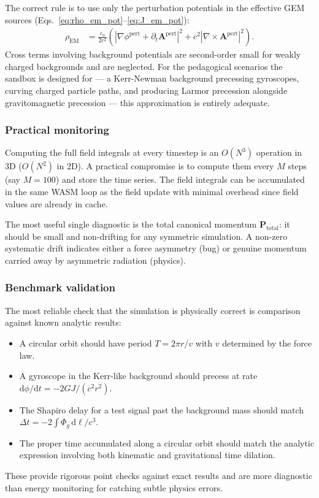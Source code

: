 \documentclass[11pt,a4paper]{article}
\newcommand{\vv}[1]{\mathbf{#1}}
\newcommand{\Phig}{\Phi_g}
\newcommand{\dd}{\mathrm{d}}
\begin{document}
The correct rule is to use only the perturbation potentials in the effective GEM sources (Eqs.~\ref{eq:rho_em_pot}--\ref{eq:J_em_pot}):
\begin{align}
  \rho_{\mathrm{EM}} &= \frac{\varepsilon_0}{2c^2}\!\left(|\nabla\phi^{\mathrm{pert}} + \partial_t\vv{A}^{\mathrm{pert}}|^2
    + c^2|\nabla\times\vv{A}^{\mathrm{pert}}|^2\right).
\end{align}
Cross terms involving background potentials are second-order small for weakly charged backgrounds and are neglected.  For the pedagogical scenarios the sandbox is designed for --- a Kerr-Newman background precessing gyroscopes, curving charged particle paths, and producing Larmor precession alongside gravitomagnetic precession --- this approximation is entirely adequate.

\subsubsection*{Practical monitoring}

Computing the full field integrals at every timestep is an $O(N^3)$ operation in 3D ($O(N^2)$ in 2D).  A practical compromise is to compute them every $M$ steps (say $M=100$) and store the time series.  The field integrals can be accumulated in the same WASM loop as the field update with minimal overhead since field values are already in cache.

The most useful single diagnostic is the total canonical momentum $\vv{P}_{\mathrm{total}}$: it should be small and non-drifting for any symmetric simulation.  A non-zero systematic drift indicates either a force asymmetry (bug) or genuine momentum carried away by asymmetric radiation (physics).

\subsubsection*{Benchmark validation}

The most reliable check that the simulation is physically correct is comparison against known analytic results:
\begin{itemize}
  \item A circular orbit should have period $T = 2\pi r/v$ with $v$ determined by the force law.
  \item A gyroscope in the Kerr-like background should precess at rate $\dd\phi/\dd t = -2GJ/(c^2r^2)$.
  \item The Shapiro delay for a test signal past the background mass should match $\Delta t = -2\int\Phig\,\dd\ell/c^3$.
  \item The proper time accumulated along a circular orbit should match the analytic expression involving both kinematic and gravitational time dilation.
\end{itemize}
These provide rigorous point checks against exact results and are more diagnostic than energy monitoring for catching subtle physics errors.
\end{document}
